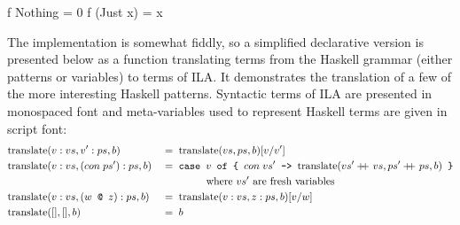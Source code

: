 \documentclass[dissertation.tex]{subfiles}
\begin{document}
{{{            \begin{haskellfigure}
            f Nothing = 0
            f (Just x) = x
            \end{haskellfigure}

            The implementation is somewhat fiddly, so a simplified declarative version is presented below as a
            function translating terms from the Haskell grammar (either patterns or variables) to terms of ILA. It
            demonstrates the translation of a few of the more interesting Haskell patterns. Syntactic terms of ILA
            are presented in monospaced font and meta-variables used to represent Haskell terms are given in script
            font:
            \begin{alignat*}{2}
            \text{translate} & (v:vs, v':ps, b) && =\; \text{translate} (vs, ps, b) [v/v'] \\
            \text{translate} & (v:vs, (con\;ps'):ps, b) && =\; \texttt{case } v \texttt{ of \{ }con\;vs'\texttt{ -> }
            \text{translate} (vs' +\kern-1.3ex+\kern0.8ex vs, ps' +\kern-1.3ex+\kern0.8ex ps, b) \texttt{ \}} \\
            & && \hspace{1.5cm}\text{where } vs' \text{ are fresh variables} \\
            \text{translate} & (v:vs, (w \texttt{ @ } z):ps, b) && =\; \text{translate} (v:vs, z:ps, b) [v/w] \\
            \text{translate} & ([], [], b) && =\; b
            \end{alignat*}

}}}
\end{document}
